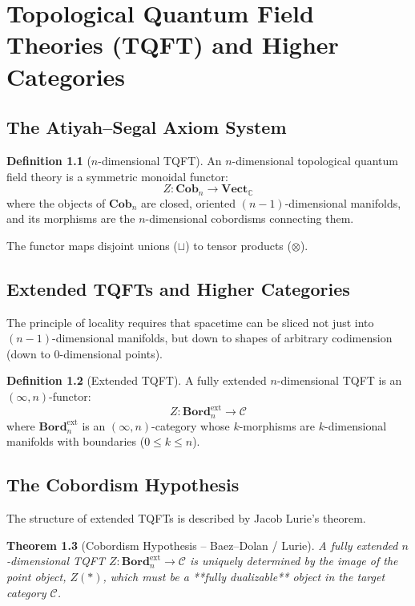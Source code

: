 \documentclass[11pt,a4paper,oneside]{book}
\theoremstyle{definition}
\newtheorem{definition}{Definition}[chapter]
\theoremstyle{plain}
\newtheorem{theorem}[definition]{Theorem}
\newcommand{\C}{\mathbb{C}}
\begin{document}
\chapter{Topological Quantum Field Theories (TQFT) and Higher Categories}

\section{The Atiyah--Segal Axiom System}
\begin{definition}[$n$-dimensional TQFT]
An $n$-dimensional topological quantum field theory is a symmetric monoidal functor:
\begin{equation}
Z: \mathbf{Cob}_n \to \mathbf{Vect}_{\C}
\end{equation}
where the objects of $\mathbf{Cob}_n$ are closed, oriented $(n-1)$-dimensional manifolds, and its morphisms are the $n$-dimensional cobordisms connecting them.
\end{definition}

The functor maps disjoint unions ($\sqcup$) to tensor products ($\otimes$).

\section{Extended TQFTs and Higher Categories}
The principle of locality requires that spacetime can be sliced not just into $(n-1)$-dimensional manifolds, but down to shapes of arbitrary codimension (down to 0-dimensional points).

\begin{definition}[Extended TQFT]
A fully extended $n$-dimensional TQFT is an $(\infty, n)$-functor:
\begin{equation}
Z: \mathbf{Bord}_n^{\text{ext}} \to \mathcal{C}
\end{equation}
where $\mathbf{Bord}_n^{\text{ext}}$ is an $(\infty, n)$-category whose $k$-morphisms are $k$-dimensional manifolds with boundaries ($0 \le k \le n$).
\end{definition}

\section{The Cobordism Hypothesis}
The structure of extended TQFTs is described by Jacob Lurie's theorem.

\begin{theorem}[Cobordism Hypothesis -- Baez--Dolan / Lurie]
A fully extended $n$-dimensional TQFT $Z: \mathbf{Bord}_n^{\text{ext}} \to \mathcal{C}$ is uniquely determined by the image of the point object, $Z(*)$, which must be a **fully dualizable** object in the target category $\mathcal{C}$.
\end{theorem}
\end{document}
